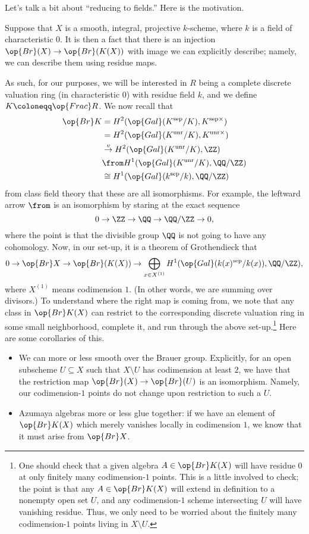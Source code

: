 \documentclass[../notes.tex]{subfiles}
\begin{document}
Let's talk a bit about ``reducing to fields.'' Here is the motivation.
\begin{remark}
	Suppose that $X$ is a smooth, integral, projective $k$-scheme, where $k$ is a field of characteristic $0$. It is then a fact that there is an injection $\op{Br}(X)\to\op{Br}(K(X))$ with image we can explicitly describe; namely, we can describe them using residue maps.
\end{remark}
As such, for our purposes, we will be interested in $R$ being a complete discrete valuation ring (in characteristic $0$) with residue field $k$, and we define $K\coloneqq\op{Frac}R$. We now recall that
\begin{align*}
	\op{Br}K &= H^2(\op{Gal}(K^{\mathrm{sep}}/K),K^{\mathrm{sep}\times}) \\
	&= H^2(\op{Gal}(K^{\mathrm{unr}}/K),K^{\mathrm{unr}\times}) \\
	&\stackrel v\to H^2(\op{Gal}(K^{\mathrm{unr}}/K),\ZZ) \\
	&\from H^1(\op{Gal}(K^{\mathrm{unr}}/K),\QQ/\ZZ) \\
	&\cong H^1(\op{Gal}(k^{\mathrm{sep}}/k),\QQ/\ZZ)
\end{align*}
from class field theory that these are all isomorphisms. For example, the leftward arrow $\from$ is an isomorphism by staring at the exact sequence
\[0\to\ZZ\to\QQ\to\QQ/\ZZ\to0,\]
where the point is that the divisible group $\QQ$ is not going to have any cohomology. Now, in our set-up, it is a theorem of Grothendieck that
\[0\to\op{Br}X\to\op{Br}(K(X))\to\bigoplus_{x\in X^{(1)}}H^1(\op{Gal}(k(x)^{\mathrm{sep}}/k(x)),\QQ/\ZZ),\]
where $X^{(1)}$ means codimension $1$. (In other words, we are summing over divisors.) To understand where the right map is coming from, we note that any class in $\op{Br}K(X)$ can restrict to the corresponding discrete valuation ring in some small neighborhood, complete it, and run through the above set-up.\footnote{One should check that a given algebra $A\in\op{Br}K(X)$ will have residue $0$ at only finitely many codimension-$1$ points. This is a little involved to check; the point is that any $A\in\op{Br}K(X)$ will extend in definition to a nonempty open set $U$, and any codimension-$1$ scheme intersecting $U$ will have vanishing residue. Thus, we only need to be worried about the finitely many codimension-$1$ points living in $X\setminus U$.} Here are some corollaries of this.
\begin{itemize}
	\item We can more or less smooth over the Brauer group. Explicitly, for an open subscheme $U\subseteq X$ such that $X\setminus U$ has codimension at least $2$, we have that the restriction map $\op{Br}(X)\to\op{Br}(U)$ is an isomorphism. Namely, our codimension-$1$ points do not change upon restriction to such a $U$.
	\item Azumaya algebras more or less glue together: if we have an element of $\op{Br}K(X)$ which merely vanishes locally in codimension $1$, we know that it must arise from $\op{Br}X$.
\end{itemize}
\end{document}
